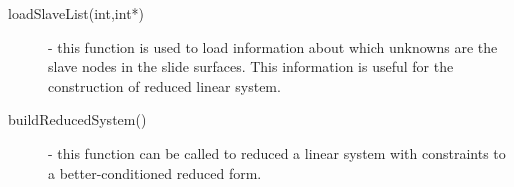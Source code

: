 \begin{description}
\item[loadSlaveList(int,int*)] - this function is used to load information
                        about which unknowns are the slave nodes in the
                        slide surfaces.  This information is useful for
                        the construction of reduced linear system.
\item[buildReducedSystem() ] - this function can be called to reduced a linear
                        system with constraints to a better-conditioned reduced
                        form.
\end{description}

%

